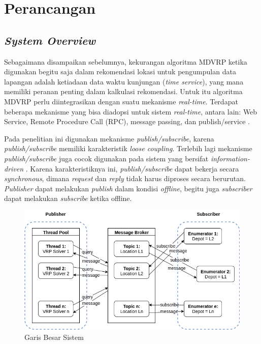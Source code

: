 \section{Perancangan}
\label{sec:design}


\subsection{\textit{System Overview}}
Sebagaimana disampaikan sebelumnya, kekurangan algoritma MDVRP ketika digunakan begitu saja dalam rekomendasi lokasi untuk pengumpulan data lapangan adalah ketiadaan data waktu kunjungan (\textit{time service}), yang mana memiliki peranan penting dalam kalkulasi rekomendasi. Untuk itu algoritma MDVRP perlu diintegrasikan dengan suatu mekanisme \textit{real-time}. Terdapat beberapa mekanisme yang bisa diadopsi untuk sistem \textit{real-time}, antara lain: Web Service, Remote Procedure Call (RPC), message passing, dan publish/service \citep{eugster_many_2003}.


Pada penelitian ini digunakan mekanisme \textit{publish/subscribe}, karena \textit{publish/subscribe} memiliki karakteristik \textit{loose coupling}. Terlebih lagi mekanisme \textit{publish/subscribe} juga cocok digunakan pada sistem yang bersifat \textit{information-driven} \citep{muhl_large-scale_2002}. Karena karakteristiknya ini, \textit{publish/subscribe} dapat bekerja secara \textit{synchronous}, dimana \textit{request} dan \textit{reply} tidak harus diproses secara berurutan. \textit{Publisher} dapat melakukan \textit{publish} dalam kondisi \textit{offline}, begitu juga \textit{subscriber} dapat melakukan \textit{subscribe} ketika offline.


\begin{figure}[!]
	\centering
	\includegraphics[width=\textwidth]{../../Resources/Images/system-overview}
	\caption{Garis Besar Sistem}
	\label{fig:system-overview}
\end{figure}


